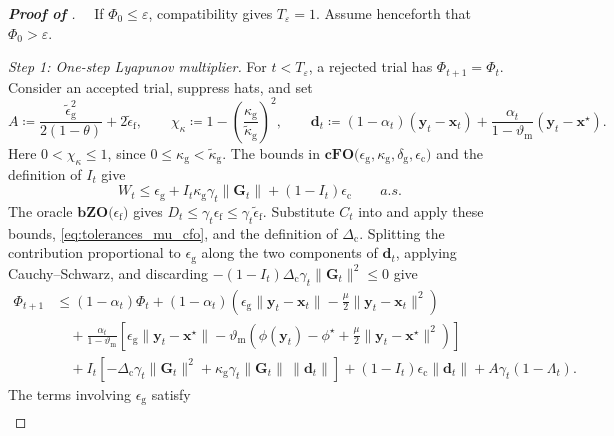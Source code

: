 \documentclass{article}
\begin{document}
\begin{proof}[\textbf{Proof of }]~\,
\label{proof:mu_pos_cfo_bzo}
If \(\Phi_0\le\varepsilon\), compatibility gives \(T_\varepsilon=1\).
Assume henceforth that \(\Phi_0>\varepsilon\).

\par\medskip
\noindent\emph{Step 1: One-step Lyapunov multiplier.}
For \(t<T_\varepsilon\), a rejected trial has \(\Phi_{t+1}=\Phi_t\).
Consider an accepted trial, suppress hats, and set
\[
A\coloneqq \frac{\widetilde\epsilon_{\mathrm{g}}^2}{2(1-\theta)}
+2\widetilde\epsilon_{\mathrm{f}},
\qquad
\chi_\kappa\coloneqq 1-
\left(\frac{\kappa_{\mathrm{g}}}{\widetilde\kappa_{\mathrm{g}}}\right)^2,
\qquad
 \bm{d}_t\coloneqq (1-\alpha_t)(\bm{y}_t-\bm{x}_t)
 +\frac{\alpha_t}{1-\vartheta_{\mathrm{m}}}(\bm{y}_t-\bm{x}^\star).
\]
Here \(0<\chi_\kappa\le1\), since
\(0\le\kappa_{\mathrm{g}}<\widetilde\kappa_{\mathrm{g}}\).
The bounds in \(\textbf{cFO(}\epsilon_{\mathrm g},\kappa_{\mathrm g},\delta_{\mathrm g},\epsilon_{\mathrm c}\textbf{)}\) and the definition of \(I_t\) give
\[
W_t\le\epsilon_{\mathrm g}+I_t\kappa_{\mathrm g}\gamma_t\|\mathbf G_t\|+(1-I_t)\epsilon_{\mathrm c}\qquad a.s.
\]
The oracle \(\textbf{bZO(}\epsilon_{\mathrm f}\textbf{)}\) gives \(D_t\le\gamma_t\epsilon_{\mathrm f}\le\gamma_t\widetilde\epsilon_{\mathrm f}\). Substitute \(C_t\) into  and apply these bounds, \eqref{eq:tolerances_mu_cfo}, and the definition of \(\Delta_{\mathrm c}\).
Splitting the contribution proportional to \(\epsilon_{\mathrm g}\)
along the two components of \(\bm{d}_t\), applying Cauchy--Schwarz,
and discarding
\(-(1-I_t)\Delta_{\mathrm{c}}\gamma_t\|\mathbf{G}_t\|^2\le0\) give
\[
\begin{aligned}
\Phi_{t+1}
&\le
(1-\alpha_t)\Phi_t
+(1-\alpha_t)
\left(
\epsilon_{\mathrm{g}}\|\bm{y}_t-\bm{x}_t\|
-\frac\mu2\|\bm{y}_t-\bm{x}_t\|^2
\right)\\
&\quad+
\frac{\alpha_t}{1-\vartheta_{\mathrm{m}}}
\left[
\epsilon_{\mathrm{g}}\|\bm{y}_t-\bm{x}^\star\|
-\vartheta_{\mathrm{m}}
\left(
\phi(\bm{y}_t)-\phi^\star
+\frac\mu2\|\bm{y}_t-\bm{x}^\star\|^2
\right)
\right]\\
&\quad+
I_t\left[
-\Delta_{\mathrm{c}}\gamma_t\|\mathbf{G}_t\|^2
+\kappa_{\mathrm{g}}\gamma_t\|\mathbf{G}_t\|\,\|\bm{d}_t\|
\right]
+(1-I_t)\epsilon_{\mathrm{c}}\|\bm{d}_t\|
+A\gamma_t(1-\Lambda_t).
\end{aligned}
\]
The terms involving \(\epsilon_{\mathrm g}\) satisfy
\[
\begin{aligned}

\end{aligned}\]
\end{proof}
\end{document}

